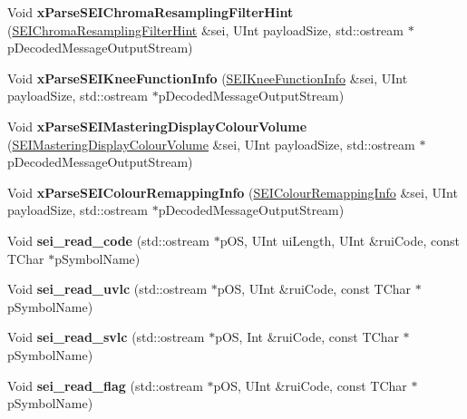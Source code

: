 \begin{DoxyCompactItemize}
\item 
\mbox{\label{class_s_e_i_reader_a6c2ea4d014919566b1eaae37f847c564}} 
Void {\bfseries x\+Parse\+S\+E\+I\+Chroma\+Resampling\+Filter\+Hint} (\hyperlink{class_s_e_i_chroma_resampling_filter_hint}{S\+E\+I\+Chroma\+Resampling\+Filter\+Hint} \&sei, U\+Int payload\+Size, std\+::ostream $\ast$p\+Decoded\+Message\+Output\+Stream)
\item 
\mbox{\label{class_s_e_i_reader_a8e39c4029ea3055526d420f032102111}} 
Void {\bfseries x\+Parse\+S\+E\+I\+Knee\+Function\+Info} (\hyperlink{class_s_e_i_knee_function_info}{S\+E\+I\+Knee\+Function\+Info} \&sei, U\+Int payload\+Size, std\+::ostream $\ast$p\+Decoded\+Message\+Output\+Stream)
\item 
\mbox{\label{class_s_e_i_reader_ad5248dc2fd5ca47788050818c3d15706}} 
Void {\bfseries x\+Parse\+S\+E\+I\+Mastering\+Display\+Colour\+Volume} (\hyperlink{class_s_e_i_mastering_display_colour_volume}{S\+E\+I\+Mastering\+Display\+Colour\+Volume} \&sei, U\+Int payload\+Size, std\+::ostream $\ast$p\+Decoded\+Message\+Output\+Stream)
\item 
\mbox{\label{class_s_e_i_reader_aa30dc79ebdb1f77acad1afd3a9732fe3}} 
Void {\bfseries x\+Parse\+S\+E\+I\+Colour\+Remapping\+Info} (\hyperlink{class_s_e_i_colour_remapping_info}{S\+E\+I\+Colour\+Remapping\+Info} \&sei, U\+Int payload\+Size, std\+::ostream $\ast$p\+Decoded\+Message\+Output\+Stream)
\item 
\mbox{\label{class_s_e_i_reader_a2b51601cd113677f0d693e5e6dd580c7}} 
Void {\bfseries sei\+\_\+read\+\_\+code} (std\+::ostream $\ast$p\+OS, U\+Int ui\+Length, U\+Int \&rui\+Code, const T\+Char $\ast$p\+Symbol\+Name)
\item 
\mbox{\label{class_s_e_i_reader_a770233b382fe544b6a01481eddbe13ee}} 
Void {\bfseries sei\+\_\+read\+\_\+uvlc} (std\+::ostream $\ast$p\+OS, U\+Int \&rui\+Code, const T\+Char $\ast$p\+Symbol\+Name)
\item 
\mbox{\label{class_s_e_i_reader_ab189d405f9ee989b454b61bf8b93ac6a}} 
Void {\bfseries sei\+\_\+read\+\_\+svlc} (std\+::ostream $\ast$p\+OS, Int \&rui\+Code, const T\+Char $\ast$p\+Symbol\+Name)
\item 
\mbox{\label{class_s_e_i_reader_aa8d3998671b925a98b7528eff0016524}} 
Void {\bfseries sei\+\_\+read\+\_\+flag} (std\+::ostream $\ast$p\+OS, U\+Int \&rui\+Code, const T\+Char $\ast$p\+Symbol\+Name)
\end{DoxyCompactItemize}
